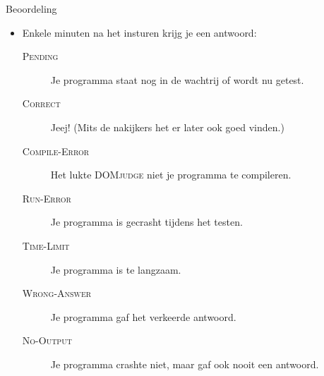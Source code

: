 \documentclass[serif,professionalfont]{beamer}
\newcommand{\DOMjudge}{\textsc{DOMjudge}\xspace}
\begin{document}
\begin{frame}{Beoordeling}

    \begin{itemize}

        \item Enkele minuten na het insturen krijg je een antwoord:
    
        \begin{description}
        
            \item[\textsc{Pending}] Je programma staat nog in de wachtrij of wordt nu getest.
        
            \item[\textsc{Correct}] Jeej! (Mits de nakijkers het er later ook goed vinden.)
            

            \item[\textsc{Compile-Error}] Het lukte \DOMjudge niet je programma te compileren.

            \item[\textsc{Run-Error}] Je programma is gecrasht tijdens het testen.

            \item[\textsc{Time-Limit}] Je programma is te langzaam.

            \item[\textsc{Wrong-Answer}] Je programma gaf het verkeerde antwoord.
            
            \item[\textsc{No-Output}] Je programma crashte niet, maar gaf ook nooit een antwoord.
            
        \end{description}
        
    \end{itemize}

\end{frame}
\end{document}
